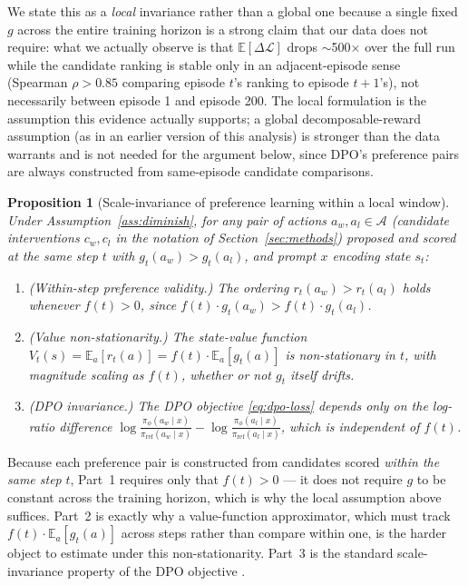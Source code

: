 \documentclass[twoside]{article}
\theoremstyle{plain}
\newtheorem{proposition}[theorem]{Proposition}
\theoremstyle{definition}
\theoremstyle{remark}
\begin{document}
We state this as a \emph{local} invariance rather than a global one because a single fixed $g$ across the entire training horizon is a strong claim that our data does not require: what we actually observe is that $\mathbb{E}[\Delta\mathcal{L}]$ drops $\sim$500$\times$ over the full run while the candidate ranking is stable only in an adjacent-episode sense (Spearman $\rho > 0.85$ comparing episode $t$'s ranking to episode $t+1$'s), not necessarily between episode 1 and episode 200. The local formulation is the assumption this evidence actually supports; a global decomposable-reward assumption (as in an earlier version of this analysis) is stronger than the data warrants and is not needed for the argument below, since DPO's preference pairs are always constructed from same-episode candidate comparisons.

\begin{proposition}[Scale-invariance of preference learning within a local window]
\label{prop:scale-invariance}
Under Assumption~\ref{ass:diminish}, for any pair of actions $a_w, a_l \in \mathcal{A}$ (candidate interventions $c_w, c_l$ in the notation of Section~\ref{sec:methods}) proposed and scored at the same step $t$ with $g_t(a_w) > g_t(a_l)$, and prompt $x$ encoding state $s_t$:
\begin{enumerate}[leftmargin=1.5em,topsep=0.2em,itemsep=0.1em]
\item \emph{(Within-step preference validity.)} The ordering $r_t(a_w) > r_t(a_l)$ holds whenever $f(t) > 0$, since $f(t) \cdot g_t(a_w) > f(t) \cdot g_t(a_l)$.
\item \emph{(Value non-stationarity.)} The state-value function $V_t(s) = \mathbb{E}_a[r_t(a)] = f(t) \cdot \mathbb{E}_a[g_t(a)]$ is non-stationary in $t$, with magnitude scaling as $f(t)$, whether or not $g_t$ itself drifts.
\item \emph{(DPO invariance.)} The DPO objective \eqref{eq:dpo-loss} depends only on the log-ratio difference $\log\tfrac{\pi_\phi(a_w \mid x)}{\pi_\text{ref}(a_w \mid x)} - \log\tfrac{\pi_\phi(a_l \mid x)}{\pi_\text{ref}(a_l \mid x)}$, which is independent of $f(t)$.
\end{enumerate}
\end{proposition}

Because each preference pair is constructed from candidates scored \emph{within the same step} $t$, Part~1 requires only that $f(t) > 0$ --- it does not require $g$ to be constant across the training horizon, which is why the local assumption above suffices. Part~2 is exactly why a value-function approximator, which must track $f(t)\cdot\mathbb{E}_a[g_t(a)]$ across steps rather than compare within one, is the harder object to estimate under this non-stationarity. Part~3 is the standard scale-invariance property of the DPO objective \citep{rafailov2023direct}.
\end{document}
